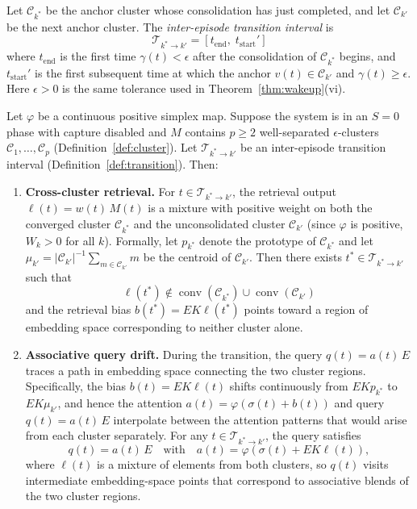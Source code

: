 \begin{definition}
\label{def:transition}
\leanok
Let $\mathcal{C}_{k^*}$ be the anchor cluster whose consolidation has just completed, and let $\mathcal{C}_{k'}$ be the next anchor cluster.  The \emph{inter-episode transition interval} is
\[
\mathcal{T}_{k^* \to k'} = [t_{\mathrm{end}},\; t_{\mathrm{start}}']
\]
where $t_{\mathrm{end}}$ is the first time $\gamma(t) < \epsilon$ after the consolidation of $\mathcal{C}_{k^*}$ begins, and $t_{\mathrm{start}}'$ is the first subsequent time at which the anchor $v(t) \in \mathcal{C}_{k'}$ and $\gamma(t) \geq \epsilon$.  Here $\epsilon > 0$ is the same tolerance used in Theorem~\ref{thm:wakeup}(vi).
\end{definition}

\begin{theorem}
\label{thm:dream_transitions}
\leanok
{}
Let $\varphi$ be a continuous positive simplex map.  Suppose the system is in an $S = 0$ phase with capture disabled and $M$ contains $p \geq 2$ well-separated $\epsilon$-clusters $\mathcal{C}_1, \ldots, \mathcal{C}_p$ (Definition~\ref{def:cluster}).  Let $\mathcal{T}_{k^* \to k'}$ be an inter-episode transition interval (Definition~\ref{def:transition}).  Then:

\begin{enumerate}
\item \textbf{Cross-cluster retrieval.}  For $t \in \mathcal{T}_{k^* \to k'}$, the retrieval output $\ell(t) = w(t)\,M(t)$ is a mixture with positive weight on both the converged cluster $\mathcal{C}_{k^*}$ and the unconsolidated cluster $\mathcal{C}_{k'}$ (since $\varphi$ is positive, $W_k > 0$ for all $k$).  Formally, let $p_{k^*}$ denote the prototype of $\mathcal{C}_{k^*}$ and let $\mu_{k'} = |\mathcal{C}_{k'}|^{-1}\sum_{m \in \mathcal{C}_{k'}} m$ be the centroid of $\mathcal{C}_{k'}$.  Then there exists $t^* \in \mathcal{T}_{k^* \to k'}$ such that
\[
\ell(t^*) \notin \operatorname{conv}(\mathcal{C}_{k^*}) \cup \operatorname{conv}(\mathcal{C}_{k'})
\]
and the retrieval bias $b(t^*) = EK\ell(t^*)$ points toward a region of embedding space corresponding to neither cluster alone.

\item \textbf{Associative query drift.}  During the transition, the query $q(t) = a(t)\,E$ traces a path in embedding space connecting the two cluster regions.  Specifically, the bias $b(t) = EK\ell(t)$ shifts continuously from $EKp_{k^*}$ to $EK\mu_{k'}$, and hence the attention $a(t) = \varphi(\sigma(t) + b(t))$ and query $q(t) = a(t)\,E$ interpolate between the attention patterns that would arise from each cluster separately.  For any $t \in \mathcal{T}_{k^* \to k'}$, the query satisfies
\[
q(t) = a(t)\,E \quad\text{with}\quad a(t) = \varphi(\sigma(t) + EK\ell(t)),
\]
where $\ell(t)$ is a mixture of elements from both clusters, so $q(t)$ visits intermediate embedding-space points that correspond to associative blends of the two cluster regions.


\end{enumerate}
\end{theorem}
